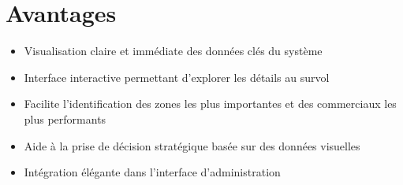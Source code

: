 \documentclass[12pt,a4paper]{article}
\begin{document}
\section{Avantages}
\begin{itemize}
    \item Visualisation claire et immédiate des données clés du système
    \item Interface interactive permettant d'explorer les détails au survol
    \item Facilite l'identification des zones les plus importantes et des commerciaux les plus performants
    \item Aide à la prise de décision stratégique basée sur des données visuelles
    \item Intégration élégante dans l'interface d'administration
\end{itemize}
\end{document}
